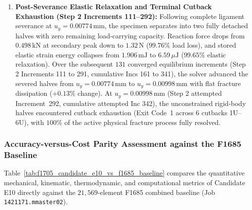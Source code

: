 \begin{enumerate}
  \item \textbf{Post-Severance Elastic Relaxation and Terminal Cutback Exhaustion (Step 2 Increments 111--292):} Following complete ligament severance at $u_y = 0.00774\,\mathrm{mm}$, the specimen separates into two fully detached halves with zero remaining load-carrying capacity. Reaction force drops from $0.498\,\mathrm{kN}$ at secondary peak down to $1.32\,\mathrm{N}$ ($99.76\%$ load loss), and stored elastic strain energy collapses from $1.906\,\mathrm{mJ}$ to $6.59\,\mu\mathrm{J}$ ($99.65\%$ elastic relaxation). Over the subsequent $131$ converged equilibrium increments (Step 2 Increments 111 to 291, cumulative Incs 161 to 341), the solver advanced the severed halves from $u_y = 0.00774\,\mathrm{mm}$ to $u_y = 0.00998\,\mathrm{mm}$ with flat fracture dissipation ($+0.13\%$ change). At $u_y = 0.00998\,\mathrm{mm}$ (Step 2 attempted Increment~292, cumulative attempted Inc 342), the unconstrained rigid-body halves encountered cutback exhaustion (Exit Code~1 across 6 cutbacks 1U--6U), with $100\%$ of the active physical fracture process fully resolved.
\end{enumerate}

\subsubsection{Accuracy-versus-Cost Parity Assessment against the F1685 Baseline}
\label{subsubsec:f1705_parity_assessment}

Table~\ref{tab:f1705_candidate_e10_vs_f1685_baseline} compares the quantitative mechanical, kinematic, thermodynamic, and computational metrics of Candidate E10 directly against the $21{,}569$-element F1685 combined baseline (Job \texttt{1421171.mmaster02}).

